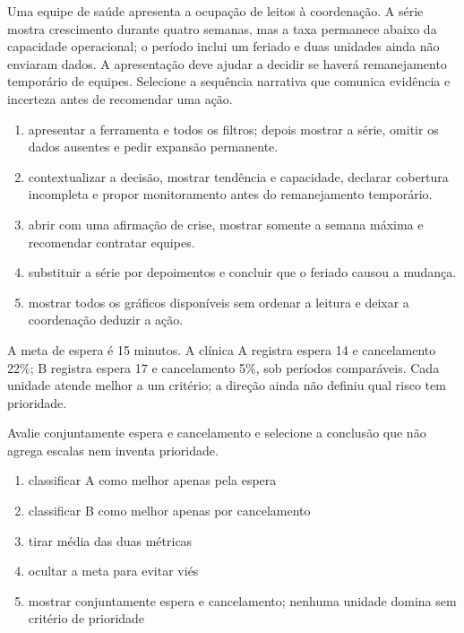 \TextoBase Uma equipe de saúde apresenta a ocupação de leitos à coordenação. A série mostra crescimento durante quatro semanas, mas a taxa permanece abaixo da capacidade operacional; o período inclui um feriado e duas unidades ainda não enviaram dados. A apresentação deve ajudar a decidir se haverá remanejamento temporário de equipes.
\FonteDidatica
\Comando Selecione a sequência narrativa que comunica evidência e incerteza antes de recomendar uma ação.
\begin{enumerate}[label=\Alph*)]
\item apresentar a ferramenta e todos os filtros; depois mostrar a série, omitir os dados ausentes e pedir expansão permanente.
\item contextualizar a decisão, mostrar tendência e capacidade, declarar cobertura incompleta e propor monitoramento antes do remanejamento temporário.
\item abrir com uma afirmação de crise, mostrar somente a semana máxima e recomendar contratar equipes.
\item substituir a série por depoimentos e concluir que o feriado causou a mudança.
\item mostrar todos os gráficos disponíveis sem ordenar a leitura e deixar a coordenação deduzir a ação.
\end{enumerate}

\TextoBase

A meta de espera é 15 minutos. A clínica A registra espera 14 e cancelamento 22\%; B registra espera 17 e cancelamento 5\%, sob períodos comparáveis. Cada unidade atende melhor a um critério; a direção ainda não definiu qual risco tem prioridade.

\FonteDidatica

\Comando Avalie conjuntamente espera e cancelamento e selecione a conclusão que não agrega escalas nem inventa prioridade.

\begin{enumerate}[label=\Alph*)]

\item classificar A como melhor apenas pela espera

\item classificar B como melhor apenas por cancelamento

\item tirar média das duas métricas

\item ocultar a meta para evitar viés

\item mostrar conjuntamente espera e cancelamento; nenhuma unidade domina sem critério de prioridade

\end{enumerate}

